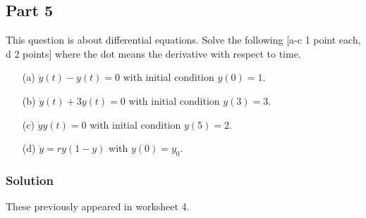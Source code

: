 \documentclass[11pt,a4paper]{scrartcl}
\begin{document}
\subsection*{Part 5}
This question is about differential equations. Solve the following [a-c 1 point each, d 2 points] where the dot means the derivative with respect to time.
	\begin{itemize}
		\item[(a)] $\dot{y}(t) - y(t) = 0$ with initial condition $y(0) = 1$.
		\item[(b)] $\dot{y}(t) + 3y(t) = 0$ with initial condition $y(3) = 3$.
		\item[(c)] $\dot{y}y(t) = 0$ with  initial condition $y(5) = 2$.
                  \item[(d)] $\dot{y}=ry(1-y)$ with $y(0)=y_0$. 
	\end{itemize}


\subsubsection*{Solution}
These previously appeared in worksheet 4.
\end{document}
